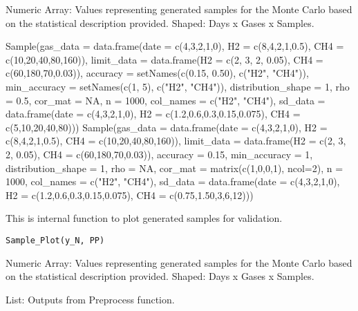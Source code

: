\documentclass[a4paper]{book}
\begin{document}
%
\begin{Value}
Numeric Array: Values representing generated samples for the Monte Carlo based on the statistical description provided. Shaped: Days x Gases x Samples.
\end{Value}
%
\begin{Examples}
\begin{ExampleCode}
Sample(gas_data = data.frame(date = c(4,3,2,1,0), H2 = c(8,4,2,1,0.5), CH4 = c(10,20,40,80,160)),
       limit_data = data.frame(H2 = c(2, 3, 2, 0.05), CH4 = c(60,180,70,0.03)),
       accuracy = setNames(c(0.15, 0.50), c("H2", "CH4")),
       min_accuracy = setNames(c(1, 5), c("H2", "CH4")),
       distribution_shape = 1,
       rho = 0.5,
       cor_mat = NA,
       n = 1000,
       col_names = c("H2", "CH4"),
       sd_data = data.frame(date = c(4,3,2,1,0), H2 = c(1.2,0.6,0.3,0.15,0.075), CH4 = c(5,10,20,40,80)))
Sample(gas_data = data.frame(date = c(4,3,2,1,0), H2 = c(8,4,2,1,0.5), CH4 = c(10,20,40,80,160)),
       limit_data = data.frame(H2 = c(2, 3, 2, 0.05), CH4 = c(60,180,70,0.03)),
       accuracy = 0.15,
       min_accuracy = 1,
       distribution_shape = 1,
       rho = NA,
       cor_mat = matrix(c(1,0,0,1), ncol=2),
       n = 1000,
       col_names = c("H2", "CH4"),
       sd_data = data.frame(date = c(4,3,2,1,0), H2 = c(1.2,0.6,0.3,0.15,0.075), CH4 = c(0.75,1.50,3,6,12)))
\end{ExampleCode}
\end{Examples}
%
\begin{Description}
This is internal function to plot generated samples for validation.
\end{Description}
%
\begin{Usage}
\begin{verbatim}
Sample_Plot(y_N, PP)
\end{verbatim}
\end{Usage}
%
\begin{Arguments}
\begin{ldescription}
\item[\code{y\_N}] Numeric Array: Values representing generated samples for the Monte Carlo based on the statistical description provided. Shaped: Days x Gases x Samples.

\item[\code{PP}] List: Outputs from Preprocess function.
\end{ldescription}
\end{Arguments}
\end{document}

